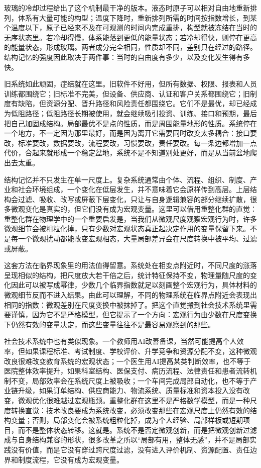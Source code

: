 玻璃的冷却过程给出了这个机制最干净的版本。液态时原子可以相对自由地重新排列，体系有大量可能的构型；温度下降时，重新排列所需的时间按指数增长，到某个温度以下，原子已经来不及在可观测的时间内完成重排，构型就被冻结在当时的无序状态里。若冷却得慢，体系能落到更低的能量状态；若冷却得快，则停在更高的能量状态，形成玻璃。两者成分完全相同，性质却不同，差别只在经过的路径。结构记忆的强度因此取决于两件事：当时的自由度有多少，以及变化发生得有多快。

旧系统如此顽固，症结就在这里。旧软件不好用，但所有数据、权限、报表和人员训练都围绕它；旧标准不完美，但设备、供应商、认证和客户关系都围绕它；旧制度有缺陷，但资源分配、晋升路径和风险责任都围绕它。它们不是最优，却已经成为低阻路径；低阻路径长期被使用，就会继续吸引投资、训练、接口和预期，最后把自己加固成结构。局部最优不是点的性质，而是周围能量地形的性质。系统停在一个地方，不一定因为那里最好，而是因为离开它需要同时改变太多耦合：接口要改，标准要改，数据要改，流程要改，习惯要改，责任要改。每一条边都增加一点代价，合起来就形成一个稳定盆地，系统不是不知道别处更好，而是从当前盆地爬出去太重。


结构记忆并不只发生在单一尺度上。复杂系统通常由个体、流程、组织、制度、产业和社会环境组成，一个变化在低层发生，并不意味着它会原样传到高层。上层结构会过滤、吸收、改写或屏蔽下层变化，只让与自身逻辑兼容的部分继续扩散，很多微观变化是真实的，但它们没有成为宏观变量。这里可以借用重整化群的直觉：重整化群在物理学中的一个重要启发是，当我们从微观尺度观察宏观行为时，许多微观细节会被粗粒化掉，只有少数对宏观状态真正起决定作用的变量保留下来。不是每一个微观扰动都能改变宏观相态，大量局部差异会在尺度转换中被平均、过滤或屏蔽\cite{wilson1971renormalization}。

这套方法在临界现象里的用法值得留意。系统处在相变点附近时，不同尺度的涨落呈现相似的结构，把尺度放大若干倍之后，统计特征保持不变，物理量随尺度的变化因此可以被写成幂律，少数几个临界指数就足以刻画整个宏观行为，具体材料的微观细节反而不进入结果。由此可以理解，不同的物理系统在临界点附近会表现出相同的指数：微观差别在尺度变换中被抹掉了。把这个直觉搬到社会技术系统里需要谨慎，因为它不是严格模型，但它提示了一个方向：宏观行为由少数在尺度变换下仍然有效的变量决定，而这些变量往往不是最容易观察到的那些。

社会技术系统中也有类似现象。一个教师用AI改善备课，当然可能提高个人效率，但如果课程标准、考试制度、学校评价、升学竞争和资源分配不变，这种微观改良很难改变教育系统的宏观状态；一个医生用AI提高某类判断效率，也不等于医院整体效率提升，如果科室结构、医保支付、病历流程、法律责任和患者流转机制不变，局部效率会在系统尺度上被吸收；一个车间完成局部自动化，也不等于产业链升级，如果订单结构、供应商能力、物流系统、质量标准和资本投入没有改变，微观优化很难越过宏观瓶颈。重整化群在这里不是严格数学模型，而是一种尺度转换直觉：技术改良要成为系统改变，必须改变那些在宏观尺度上仍然有效的结构变量；否则，局部变化会被系统粗粒化掉，成为个人经验、局部样板或短期项目，而不是整体状态转移。这就是。系统不是否定微观创新，而是把微观创新过滤成与自身结构兼容的形状，很多改革之所以“局部有用，整体无感”，并不是局部实践没有价值，而是它没有穿过跨尺度过滤，没有进入评价机制、资源配置、责任边界和制度流程，它没有成为宏观变量。

